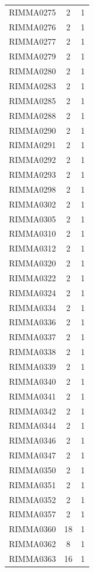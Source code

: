 \documentclass[11pt]{article}
\newcounter{rowno}
\begin{document}
\begin{scriptsize}
\begin{longtable}{>{\stepcounter{rowno}}ccc}
    RIMMA0275 & 2     & 1 \\
    RIMMA0276 & 2     & 1 \\
    RIMMA0277 & 2     & 1 \\
    RIMMA0279 & 2     & 1 \\
    RIMMA0280 & 2     & 1 \\
    RIMMA0283 & 2     & 1 \\
    RIMMA0285 & 2     & 1 \\
    RIMMA0288 & 2     & 1 \\
    RIMMA0290 & 2     & 1 \\
    RIMMA0291 & 2     & 1 \\
    RIMMA0292 & 2     & 1 \\
    RIMMA0293 & 2     & 1 \\
    RIMMA0298 & 2     & 1 \\
    RIMMA0302 & 2     & 1 \\
    RIMMA0305 & 2     & 1 \\
    RIMMA0310 & 2     & 1 \\
    RIMMA0312 & 2     & 1 \\
    RIMMA0320 & 2     & 1 \\
    RIMMA0322 & 2     & 1 \\
    RIMMA0324 & 2     & 1 \\
    RIMMA0334 & 2     & 1 \\
    RIMMA0336 & 2     & 1 \\
    RIMMA0337 & 2     & 1 \\
    RIMMA0338 & 2     & 1 \\
    RIMMA0339 & 2     & 1 \\
    RIMMA0340 & 2     & 1 \\
    RIMMA0341 & 2     & 1 \\
    RIMMA0342 & 2     & 1 \\
    RIMMA0344 & 2     & 1 \\
    RIMMA0346 & 2     & 1 \\
    RIMMA0347 & 2     & 1 \\
    RIMMA0350 & 2     & 1 \\
    RIMMA0351 & 2     & 1 \\
    RIMMA0352 & 2     & 1 \\
    RIMMA0357 & 2     & 1 \\
    RIMMA0360 & 18    & 1 \\
    RIMMA0362 & 8     & 1 \\
    RIMMA0363 & 16    & 1 \\

\end{longtable}
\end{scriptsize}
\end{document}

